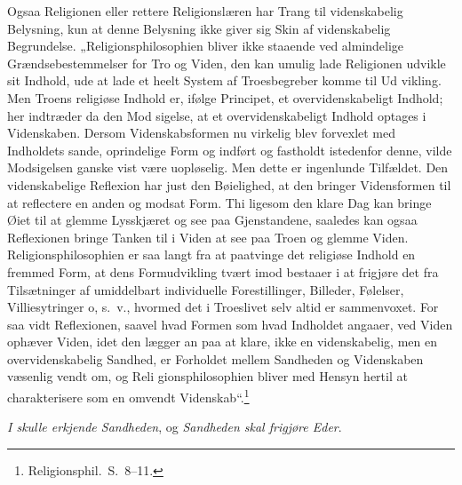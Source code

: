 \documentclass[12pt,a4paper]{article}
\newcommand{\opage}[1]{\marginnote{\footnotesize\textit{[#1]}}}
\begin{document}
Ogsaa Religionen eller rettere Religionslæren har Trang til
videnskabelig Belysning, kun at denne Belysning ikke giver sig
Skin af videnskabelig Begrundelse. „Religionsphilosophien bliver
ikke staaende ved almindelige Grændsebestemmelser for Tro og
Viden, den kan umulig lade Religionen udvikle sit Indhold,
ude at lade et heelt System af Troesbegreber komme til Ud\-%
vikling. Men Troens religiøse Indhold er, ifølge Principet,
et overvidenskabeligt Indhold; her indtræder da den Mod\-%
sigelse, at et overvidenskabeligt Indhold optages i Videnskaben.
Dersom Videnskabsformen nu virkelig blev forvexlet med Indholdets
sande, oprindelige Form og indført og fastholdt istedenfor denne,
vilde Modsigelsen ganske vist være uopløselig. Men dette er
ingenlunde Tilfældet. Den videnskabelige Reflexion har just den
\opage{55}Bøielighed, at den bringer Vidensformen til at reflectere en anden
og modsat Form. Thi ligesom den klare Dag kan bringe Øiet
til at glemme Lysskjæret og see paa Gjenstandene, saaledes kan ogsaa
Reflexionen bringe Tanken til i Viden at see paa Troen og glemme
Viden. Religionsphilosophien er saa langt fra at paatvinge det
religiøse Indhold en fremmed Form, at dens Formudvikling tvært\-%
imod bestaaer i at frigjøre det fra Tilsætninger af umiddelbart
individuelle Forestillinger, Billeder, Følelser, Villiesytringer o, s.\ v.,
hvormed det i Troeslivet selv altid er sammenvoxet. For saa
vidt Reflexionen, saavel hvad Formen som hvad Indholdet angaaer,
ved Viden ophæver Viden, idet den lægger an paa at klare, ikke
en videnskabelig, men en overvidenskabelig Sandhed, er Forholdet
mellem Sandheden og Videnskaben væsenlig vendt om, og Reli\-%
gionsphilosophien bliver med Hensyn hertil at charakterisere som
en omvendt Videnskab“.\footnote{Religionsphil.\ S.\ 8--11.} %

\emph{I skulle erkjende Sandheden}, og \emph{Sandheden skal
frigjøre Eder}.
\end{document}

